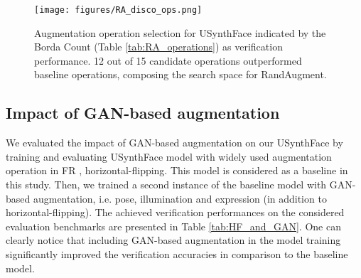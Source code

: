 \documentclass[10pt,twocolumn,letterpaper]{ieeeconf}
\begin{document}
\begin{figure}[h!]
	\centering
	\texttt{[image: figures/RA\_disco\_ops.png]}
	\vspace{-3mm}
    \caption{Augmentation operation selection for USynthFace indicated by the Borda Count (Table \ref{tab:RA_operations}) as verification performance. 12 out of 15 candidate operations outperformed baseline operations, composing the search space for RandAugment.}
	\label{fig:RA_operations}
	\vspace{-4mm}
\end{figure}





\subsection{Impact of GAN-based augmentation}
\label{sec:abl_impact_GAN_based}
We evaluated the impact of GAN-based augmentation on our USynthFace by training and evaluating USynthFace model with widely used augmentation operation in FR \cite{ElasticFace, ArcFace, CurricularFace, SphereFace}, horizontal-flipping. This model is considered as a baseline in this study. Then, we trained a second instance of the baseline model with GAN-based augmentation, i.e. pose, illumination and expression (in addition to horizontal-flipping). The achieved verification performances on the considered evaluation benchmarks are presented in Table \ref{tab:HF_and_GAN}. One can clearly notice that including GAN-based augmentation in the model training significantly improved the verification accuracies in comparison to the baseline model.
\end{document}
